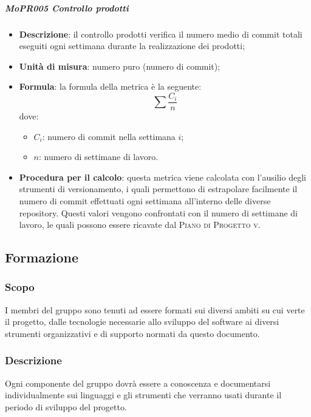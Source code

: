 \subparagraph{MoPR005 Controllo prodotti}
\begin{itemize}
  \item \textbf{Descrizione}: il controllo prodotti verifica il numero medio di commit totali eseguiti ogni settimana durante la realizzazione dei prodotti;
  \item \textbf{Unità di misura}: numero puro (numero di commit);
  \item \textbf{Formula}: la formula della metrica è la seguente:
  \begin{displaymath}
    \sum \frac{C_i}{n}
  \end{displaymath}
  dove:
  \begin{itemize}
    \item $ C_i $: numero di commit nella settimana $ i $;
    \item $ n $: numero di settimane di lavoro.
  \end{itemize}
  \item \textbf{Procedura per il calcolo}: questa metrica viene calcolata con l'ausilio degli strumenti di versionamento, i quali permettono di estrapolare facilmente il numero di commit effettuati ogni settimana all'interno delle diverse repository. Questi valori vengono confrontati con il numero di settimane di lavoro, le quali possono essere ricavate dal \textsc{Piano di Progetto v}.
\end{itemize}

\subsection{Formazione}
\subsubsection{Scopo}
I membri del gruppo sono tenuti ad essere formati sui diversi ambiti su cui verte il progetto, dalle tecnologie necessarie allo sviluppo del software ai diversi strumenti organizzativi e di supporto normati da questo documento.

\subsubsection{Descrizione}
Ogni componente del gruppo dovrà essere a conoscenza e documentarsi individualmente sui linguaggi e gli strumenti che verranno usati durante il periodo di sviluppo del progetto.

